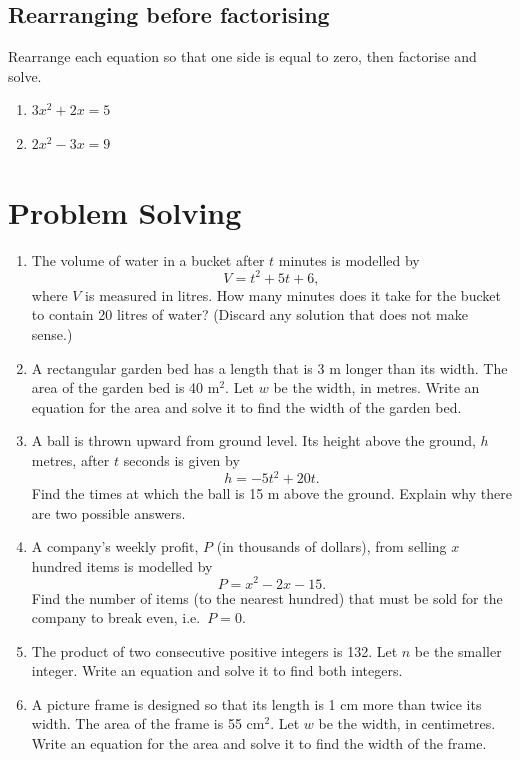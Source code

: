 \documentclass[11pt]{article}
\newcommand{\qspace}{\vspace{1.1cm}}
\begin{document}
\subsection*{Rearranging before factorising}
Rearrange each equation so that one side is equal to zero, then factorise and solve.

\begin{enumerate}[resume]
  \item $3x^2 + 2x = 5$
  \qspace
  \item $2x^2 - 3x = 9$
  \qspace
\end{enumerate}

\newpage
\section{Problem Solving}

\begin{enumerate}
  \item The volume of water in a bucket after $t$ minutes is modelled by
  \[
    V = t^2 + 5t + 6,
  \]
  where $V$ is measured in litres. How many minutes does it take for the bucket to contain 20 litres of water? (Discard any solution that does not make sense.)
  \qspace

  \item A rectangular garden bed has a length that is 3 m longer than its width. The area of the garden bed is 40 m$^2$. Let $w$ be the width, in metres. Write an equation for the area and solve it to find the width of the garden bed.
  \qspace

  \item A ball is thrown upward from ground level. Its height above the ground, $h$ metres, after $t$ seconds is given by
  \[
    h = -5t^2 + 20t.
  \]
  Find the times at which the ball is 15 m above the ground. Explain why there are two possible answers.
  \qspace

  \item A company's weekly profit, $P$ (in thousands of dollars), from selling $x$ hundred items is modelled by
  \[
    P = x^2 - 2x - 15.
  \]
  Find the number of items (to the nearest hundred) that must be sold for the company to break even, i.e.\ $P = 0$.
  \qspace

  \item The product of two consecutive positive integers is 132. Let $n$ be the smaller integer. Write an equation and solve it to find both integers.
  \qspace

  \item A picture frame is designed so that its length is 1 cm more than twice its width. The area of the frame is 55 cm$^2$. Let $w$ be the width, in centimetres. Write an equation for the area and solve it to find the width of the frame.
  \qspace
\end{enumerate}
\end{document}
